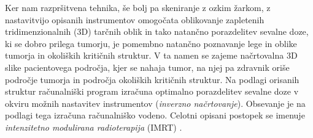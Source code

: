\documentclass[a4paper,twoside,11pt]{article}
\begin{document}
	\par{
	  Ker nam razpršitvena tehnika, še bolj pa skeniranje z ozkim žarkom, z nastavitvijo opisanih instrumentov omogočata oblikovanje zapletenih tridimenzionalnih (3D) tarčnih oblik in tako natančno porazdelitev sevalne doze, ki se dobro prilega tumorju, je pomembno natančno poznavanje lege in oblike tumorja in okoliških kritičnih struktur. V ta namen se zajeme načrtovalna 3D slike pacientovega področja, kjer se nahaja tumor, na njej pa zdravnik oriše področje tumorja in področja okoliških kritičnih struktur. Na podlagi orisanih struktur računalniški program izračuna optimalno porazdelitev sevalne doze v okviru možnih nastavitev instrumentov (\emph{inverzno načrtovanje}). Obsevanje je na podlagi tega izračuna računalniško vodeno. Celotni opisani postopek se imenuje \emph{intenzitetno modulirana radioterapija} (IMRT) \cite{jaffray2012}.
	}
\end{document}
